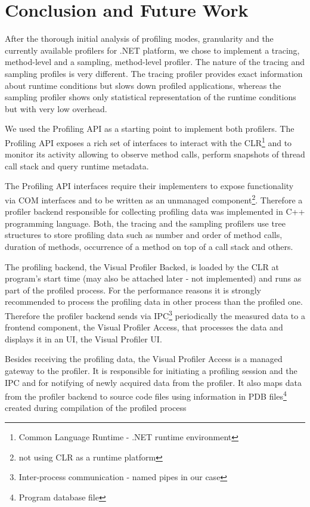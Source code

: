 \chapter{Conclusion and Future Work}

After the thorough initial analysis of profiling modes, granularity and the currently available profilers for .NET platform, we chose to implement a tracing, method-level and a sampling, method-level profiler. The nature of the tracing and sampling profiles is very different. The tracing profiler provides exact information about runtime conditions but slows down profiled applications, whereas the sampling profiler shows only statistical representation of the runtime conditions but with very low overhead.

We used the Profiling API as a starting point to implement both profilers. The Profiling API exposes a rich set of interfaces to interact with the CLR\footnote{Common Language Runtime - .NET runtime environment} and to monitor its activity allowing to observe method calls, perform snapshots of thread call stack and query runtime metadata.

The Profiling API interfaces require their implementers to expose functionality via COM interfaces and to be written as an unmanaged component\footnote{not using CLR as a runtime platform}. Therefore a profiler backend responsible for collecting profiling data was implemented in C++ programming language. Both, the tracing and the sampling profilers use tree structures to store profiling data such as number and order of method calls, duration of methods, occurrence of a method on top of a call stack and others.

The profiling backend, the Visual Profiler Backed, is loaded by the CLR at program's start time (may also be attached later - not implemented) and runs as part of the profiled process. For the performance reasons it is strongly recommended to process the profiling data in other process than the profiled one. Therefore the profiler backend sends via IPC\footnote{Inter-process communication - named pipes in our case} periodically the measured data to a frontend component, the Visual Profiler Access, that processes the data and displays it in an UI, the Visual Profiler UI. 

Besides receiving the profiling data, the Visual Profiler Access is a managed gateway to the profiler. It is responsible for initiating a profiling session and the IPC and for notifying of newly acquired data from the profiler. It also maps data from the profiler backend to source code files using information in PDB files\footnote{Program database file} created during compilation of the profiled process

